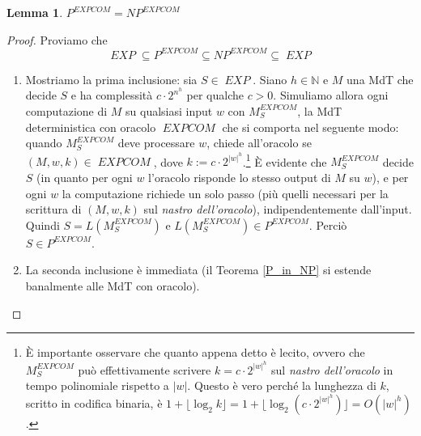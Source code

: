 \documentclass[12pt,a4paper]{report}
\theoremstyle{definition}
\newtheorem{lemma}[teo]{Lemma}  %
\DeclareMathOperator{\ec}{\textit{EXPCOM}}
\DeclareMathOperator{\ex}{\textit{EXP}}
\begin{document}
\begin{lemma}\label{lemma_oracoli}
$P^{\ec}=NP^{\ec}$
\begin{proof}
Proviamo che
$$\ex \subseteq P^{\ec} \subseteq NP^{\ec} \subseteq \ex$$
\begin{enumerate}
\item Mostriamo la prima inclusione: sia $S \in \ex$. Siano $h \in \mathbb{N}$ e $M$ una MdT che decide $S$ e ha complessità $c \cdot 2^{n^h}$ per qualche $c>0$. Simuliamo allora ogni computazione di $M$ su qualsiasi input $w$ con $M_S^{\ec}$, la MdT deterministica con oracolo $\ec$ che si comporta nel seguente modo: quando $M_S^{\ec}$ deve processare $w$, chiede all'oracolo se $(M,w,k) \in \ec$, dove $k:=c \cdot 2^{|w|^h}$.\footnote{È importante osservare che quanto appena detto è lecito, ovvero che $M_S^{\ec}$ può effettivamente scrivere $k=c \cdot 2^{|w|^h}$ sul \emph{nastro dell'oracolo} in tempo polinomiale rispetto a $|w|$. Questo è vero perché la lunghezza di $k$, scritto in codifica binaria, è $1+\lfloor \log_2 k \rfloor=1+\lfloor \log_2 \left(c \cdot 2^{|w|^h}\right) \rfloor= O(|w|^h)$.} È evidente che $M_S^{\ec}$ decide $S$ (in quanto per ogni $w$ l'oracolo risponde lo stesso output di $M$ su $w$), e per ogni $w$ la computazione richiede un solo passo (più quelli necessari per la scrittura di $(M,w,k)$ sul \emph{nastro dell'oracolo}), indipendentemente dall'input. Quindi $S=L(M_S^{\ec})$ e $L(M_S^{\ec}) \in P^{\ec}$. Perciò $S \in P^{\ec}$.

\item La seconda inclusione è immediata (il Teorema \ref{P_in_NP} si estende banalmente alle MdT con oracolo).


\end{enumerate}
\end{proof}
\end{lemma}
\end{document}
